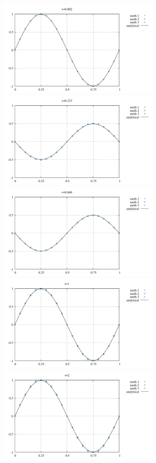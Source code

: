 \begin{center}
\includegraphics[width=8cm]{python_codes/fieldstone_164/results/u_0.pdf}
\includegraphics[width=8cm]{python_codes/fieldstone_164/results/u_1.pdf}\\
\includegraphics[width=8cm]{python_codes/fieldstone_164/results/u_2.pdf}
\includegraphics[width=8cm]{python_codes/fieldstone_164/results/u_3.pdf}\\
\includegraphics[width=8cm]{python_codes/fieldstone_164/results/u_4.pdf}

\end{center}
